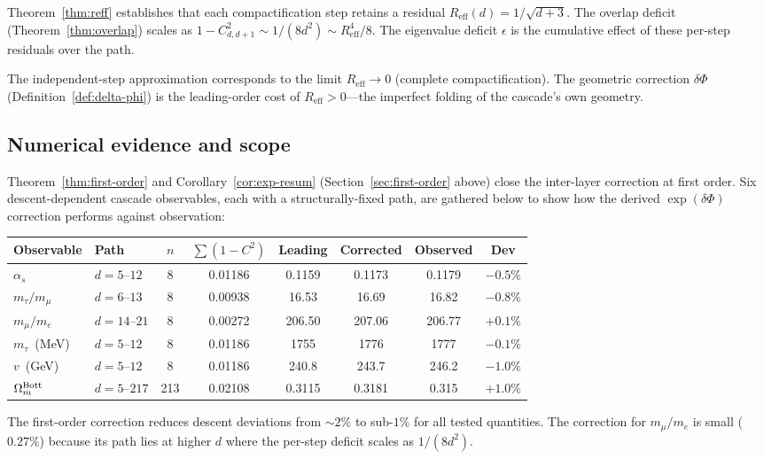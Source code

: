 \documentclass[11pt,a4paper]{article}
\begin{document}
Theorem~\ref{thm:reff} establishes that each compactification step retains a residual $R_{\mathrm{eff}}(d) = 1/\sqrt{d+3}$. The overlap deficit (Theorem~\ref{thm:overlap}) scales as $1-C_{d,d+1}^2 \sim 1/(8d^2) \sim R_{\mathrm{eff}}^4/8$. The eigenvalue deficit $\epsilon$ is the cumulative effect of these per-step residuals over the path.

The independent-step approximation corresponds to the limit $R_{\mathrm{eff}} \to 0$ (complete compactification). The geometric correction $\delta\Phi$ (Definition~\ref{def:delta-phi}) is the leading-order cost of $R_{\mathrm{eff}} > 0$---the imperfect folding of the cascade's own geometry.

\subsection{Numerical evidence and scope}

Theorem~\ref{thm:first-order} and Corollary~\ref{cor:exp-resum} (Section~\ref{sec:first-order} above) close the inter-layer correction at first order. Six descent-dependent cascade observables, each with a structurally-fixed path, are gathered below to show how the derived $\exp(\delta\Phi)$ correction performs against observation:

\begin{center}
\renewcommand{\arraystretch}{1.3}
\begin{tabular}{llcccccc}
\toprule
Observable & Path & $n$ & $\sum(1-C^2)$ & Leading & Corrected & Observed & Dev \\
\midrule
$\alpha_s$ & $d\!=\!5$--$12$ & 8 & 0.01186 & 0.1159 & 0.1173 & 0.1179 & $-0.5\%$ \\
$m_\tau/m_\mu$ & $d\!=\!6$--$13$ & 8 & 0.00938 & 16.53 & 16.69 & 16.82 & $-0.8\%$ \\
$m_\mu/m_e$ & $d\!=\!14$--$21$ & 8 & 0.00272 & 206.50 & 207.06 & 206.77 & $+0.1\%$ \\
$m_\tau$~(MeV) & $d\!=\!5$--$12$ & 8 & 0.01186 & 1755 & 1776 & 1777 & $-0.1\%$ \\
$v$~(GeV) & $d\!=\!5$--$12$ & 8 & 0.01186 & 240.8 & 243.7 & 246.2 & $-1.0\%$ \\
$\Omega_m^{\rm Bott}$ & $d\!=\!5$--$217$ & 213 & 0.02108 & 0.3115 & 0.3181 & 0.315 & $+1.0\%$ \\
\bottomrule
\end{tabular}
\end{center}

\noindent The first-order correction reduces descent deviations from $\sim\!2\%$ to sub-$1\%$ for all tested quantities. The correction for $m_\mu/m_e$ is small ($0.27\%$) because its path lies at higher $d$ where the per-step deficit scales as $1/(8d^2)$.
\end{document}
